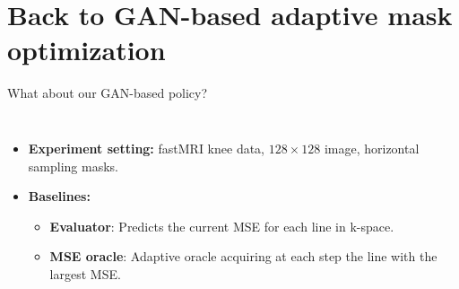


\section{Back to GAN-based adaptive mask optimization}

    

\begin{frame}[t]{What about our GAN-based policy?}
    \vspace{-.3cm}
    \begin{columns}[totalwidth=\linewidth]
        \begin{itemize}
            \item<2->  \textbf{Experiment setting:} fastMRI knee data, $128\times 128$ image, horizontal sampling masks.
            \item<2-> \textbf{Baselines:}
            \begin{itemize}
                \item<2->  \textbf{Evaluator}: Predicts the current MSE for each line in k-space. \hfill  \parencite{zhang2019reducing}
                \item<2->  \textbf{MSE oracle}: Adaptive oracle acquiring at each step the line with the largest MSE.
            \end{itemize}
       

\end{itemize}
\end{columns}
\end{frame}
